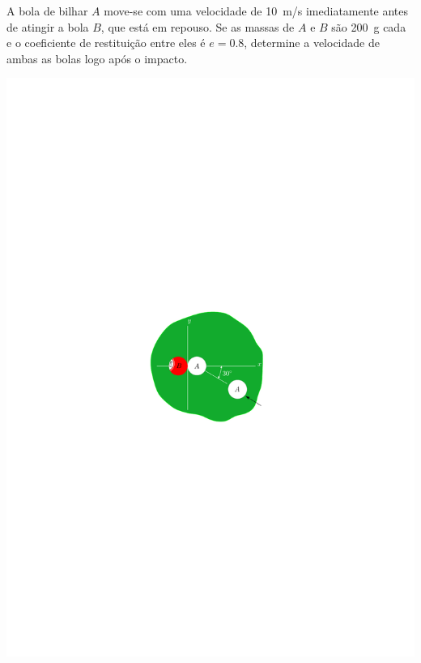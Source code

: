 \item A bola de bilhar $A$ move-se com uma velocidade de \SI{10}{\meter/\second} imediatamente antes de atingir a bola $B$, que está em repouso. Se as massas de $A$ e $B$ são \SI{200}{\gram} cada e o coeficiente de restituição entre eles é $e=0.8$, determine a velocidade de ambas as bolas logo após o impacto.

\begin{flushright}
	\includegraphics[scale=1.4]{images/draw_11}
\end{flushright}